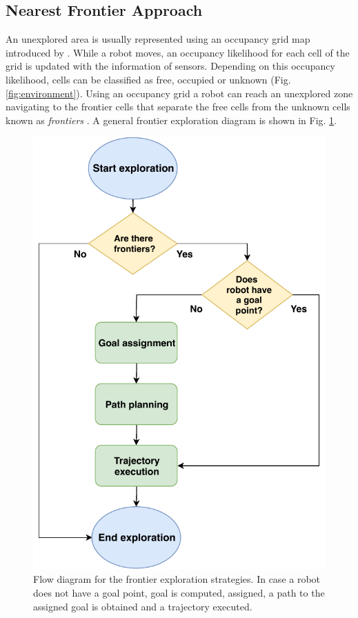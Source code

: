 \subsection{Nearest Frontier Approach} 
An unexplored area is usually represented using an occupancy grid map introduced by \cite{Moravec}. While a robot moves, an occupancy likelihood for each cell of the grid is updated with the information of sensors. Depending on this occupancy likelihood, cells can be classified as free, occupied or unknown (Fig. \ref{fig:environment}). Using an occupancy grid a robot can reach an unexplored zone navigating to the frontier cells that separate the free cells from the unknown cells known as \textit{frontiers} \cite{Yamauchi1997}. A general frontier exploration diagram is shown in Fig. \ref{fig:flow_diagram}.
\begin{figure}[t!]
	\centering\includegraphics[width=0.85\columnwidth]{./pictures/flow_diagram.pdf}
	\caption{Flow diagram for the frontier exploration strategies. In case a robot does not have a goal point, goal is computed, assigned, a path to the assigned goal is obtained and a trajectory executed.}
	\label{fig:flow_diagram}
\end{figure}
